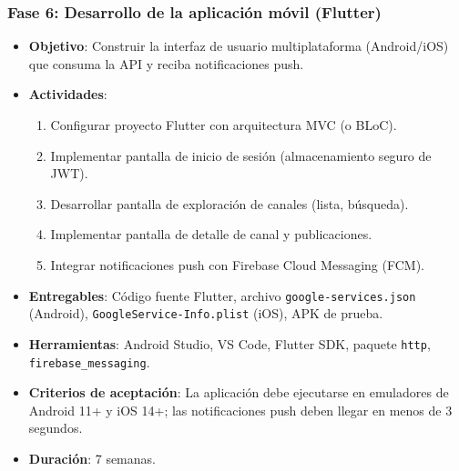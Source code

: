 \subsubsection{Fase 6: Desarrollo de la aplicación móvil (Flutter)}
\begin{itemize}
    \item \textbf{Objetivo}: Construir la interfaz de usuario multiplataforma (Android/iOS) que consuma la API y reciba notificaciones push.
    \item \textbf{Actividades}:
        \begin{enumerate}
            \item Configurar proyecto Flutter con arquitectura MVC (o BLoC).
            \item Implementar pantalla de inicio de sesión (almacenamiento seguro de JWT).
            \item Desarrollar pantalla de exploración de canales (lista, búsqueda).
            \item Implementar pantalla de detalle de canal y publicaciones.
            \item Integrar notificaciones push con Firebase Cloud Messaging (FCM).
        \end{enumerate}
    \item \textbf{Entregables}: Código fuente Flutter, archivo \texttt{google-services.json} (Android), \texttt{GoogleService-Info.plist} (iOS), APK de prueba.
    \item \textbf{Herramientas}: Android Studio, VS Code, Flutter SDK, paquete \texttt{http}, \texttt{firebase\_messaging}.
    \item \textbf{Criterios de aceptación}: La aplicación debe ejecutarse en emuladores de Android 11+ y iOS 14+; las notificaciones push deben llegar en menos de 3 segundos.
    \item \textbf{Duración}: 7 semanas.
\end{itemize}


